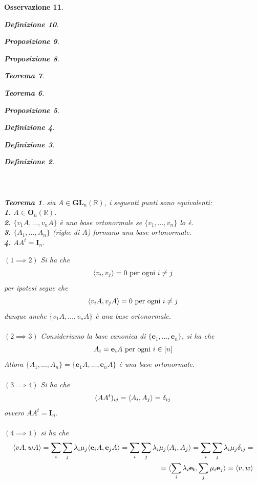 \documentclass[oneside, 11pt]{amsbook}
\makeatletter
\newcommand{\0}{{(0)}}
\newcommand{\3}{{(3)}}
\theoremstyle{colonplain}
\newtheorem{thm}{Teorema}[chapter]
\newtheorem{prop}[thm]{Proposizione}
\theoremstyle{colondefinition}
\newtheorem{defn}[thm]{Definizione}
\theoremstyle{colonremark}
\newtheorem{rmk}[thm]{Osservazione}
\numberwithin{equation}{chapter}
\renewcommand{\proofname}{Dimostrazione}
\renewenvironment{proof}[1][\proofname]{\par
  \pushQED{\end{proof}}%
  \normalfont \topsep6\p@\@plus6\p@\relax
  \trivlist
  \item[\hskip\labelsep\bfseries #1:]\ignorespaces
}{%
  \popQED\endtrivlist\@endpefalse
}
\makeatother
\begin{document}
\begin{rmk}
\begin{defn}
\begin{prop}
\begin{prop}
\begin{thm}
\begin{thm}
\begin{prop}
\begin{defn}
\begin{defn}
\begin{defn}
\begin{align}
\end{align} \\ \\
\begin{thm} sia $A \in \mathbf{GL}_n(\mathbb{R})$, i seguenti punti sono equivalenti: \\
\textbf{1.} $A \in \mathbf{O}_n(\mathbb{R})$. \\
\textbf{2.} $\{ v_1A, \dots, v_nA \}$ è una base ortonormale se $\{ v_1, \dots, v_n \}$ lo è. \\
\textbf{3.} $\{ A_1, \dots, A_n \}$ (righe di $A$) formano una base ortonormale. \\
\textbf{4.} $AA^t = \mathbf{I}_n$. \\

\begin{proof} $(1 \implies 2)$ Si ha che
\begin{align}
    \langle v_i, v_j \rangle = 0 \text{ per ogni } i \neq j \notag
\end{align}
per ipotesi segue che
\begin{align}
    \langle v_iA, v_jA \rangle = 0 \text{ per ogni } i \neq j \notag
\end{align}
dunque anche $\{ v_1A, \dots, v_nA \}$ è una base ortonormale. \\ \\
$(2 \implies 3)$ Consideriamo la base canonica di $\{ \mathbf{e}_1, \dots, \mathbf{e}_n \}$, si ha che
\begin{align}
    A_i = \mathbf{e}_iA \text{ per ogni } i \in [n] \notag
\end{align}
Allora $\{ A_1, \dots, A_n \} = \{ \mathbf{e}_1A, \dots, \mathbf{e}_nA \}$ è una base ortonormale. \\ \\
$(3 \implies 4)$ Si ha che
\begin{align}
    (AA^t)_{ij} = \langle A_i, A_j \rangle  = \delta_{ij} \notag
\end{align}
ovvero $AA^t = \mathbf{I}_n$. \\ \\
$(4 \implies 1)$ si ha che
\begin{align}
    \langle vA, wA \rangle = \sum_i \sum_j \lambda_i\mu_j \langle \mathbf{e}_iA, \mathbf{e}_jA \rangle = \sum_i \sum_j \lambda_i\mu_j \langle A_i, A_j \rangle = \sum_i\sum_j \lambda_i\mu_j \delta_{ij} = \notag \\
    = \langle \sum_i \lambda_i\mathbf{e_i}, \sum_j \mu_i\mathbf{e}_j \rangle = \langle v, w \rangle \notag
\end{align} \end{proof}

\end{thm}
\end{defn}
\end{defn}
\end{defn}
\end{prop}
\end{thm}
\end{thm}
\end{prop}
\end{prop}
\end{defn}
\end{rmk}
\end{document}
